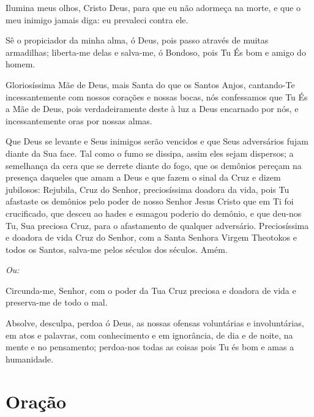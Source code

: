 \documentclass{subfiles}
\begin{document}

Ilumina meus olhos, Cristo Deus, para que eu não adormeça na morte,
e que o meu inimigo jamais diga: eu prevaleci contra ele.

\doxology{}

Sê o propiciador da minha alma, ó Deus, pois passo através de muitas armadilhas;
liberta-me delas e salva-me, ó Bondoso, pois Tu És bom e amigo do homem.

\nowandever{}

Gloriosíssima Mãe de Deus, mais Santa do que os Santos Anjos, cantando-Te
incessantemente com nossos corações e nossas bocas, nós confessamos que Tu És a
Mãe de Deus, pois verdadeiramente deste à luz a Deus encarnado por nós, e
incessantemente oras por nossas almas.


Que Deus se levante e Seus inimigos serão vencidos e que Seus adversários fujam
diante da Sua face. Tal como o fumo se dissipa, assim eles sejam dispersos; a
semelhança da cera que se derrete diante do fogo, que os demônios pereçam na
presença daqueles que amam a Deus e que fazem o sinal da Cruz e dizem jubilosos:
Rejubila, Cruz do Senhor, preciosíssima doadora da vida, pois Tu afastaste os
demônios pelo poder de nosso Senhor Jesus Cristo que em Ti foi crucificado, que
desceu ao hades e esmagou poderio do demônio, e que deu-nos Tu, Sua preciosa
Cruz, para o afastamento de qualquer adversário. Preciosíssima e doadora de vida
Cruz do Senhor, com a Santa Senhora Virgem Theotokos e todos os Santos, salva-me
pelos séculos dos séculos. Amém.

\textit{Ou:}

Circunda-me, Senhor, com o poder da Tua Cruz preciosa e doadora de
vida e preserva-me de todo o mal.


Absolve, desculpa, perdoa ó Deus, as nossas ofensas voluntárias e
involuntárias, em atos e palavras, com conhecimento e em ignorância, de dia
e de noite, na mente e no pensamento; perdoa-nos todas as coisas pois Tu és
bom e amas a humanidade.

\section*{Oração}
\end{document}
